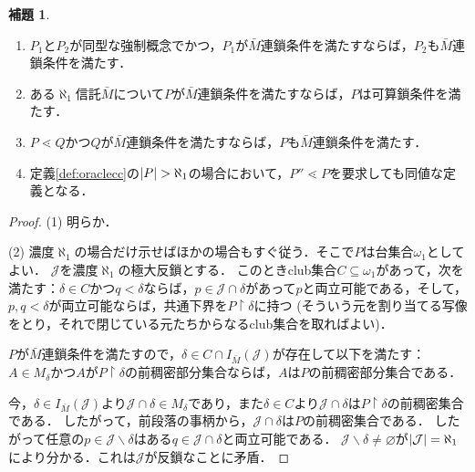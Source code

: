 \documentclass[uplatex]{jsarticle}
\newcommand{\restrict}{\upharpoonright}
\DeclarePairedDelimiter\abs{\lvert}{\rvert}
\renewcommand\emptyset{\varnothing}
\renewcommand\subset{\subseteq}
\renewcommand{\setminus}{\smallsetminus}
\theoremstyle{definition}
\newtheorem{lem}[thm]{補題}
\begin{document}
	\begin{lem}
		\begin{enumerate}
			\item $P_1$と$P_2$が同型な強制概念でかつ，$P_1$が$\bar{M}$連鎖条件を満たすならば，$P_2$も$\bar{M}$連鎖条件を満たす．
			\item ある$\aleph_1$信託$\bar{M}$について$P$が$\bar{M}$連鎖条件を満たすならば，$P$は可算鎖条件を満たす．
			\item $P \lessdot Q$かつ$Q$が$\bar{M}$連鎖条件を満たすならば，$P$も$\bar{M}$連鎖条件を満たす．
			\item 定義\ref{def:oraclecc}の$\abs{P} > \aleph_1$の場合において，$P'' \lessdot P$を要求しても同値な定義となる．
		\end{enumerate}
	\end{lem}
	\begin{proof}
		(1) 明らか．
		
		(2) 濃度$\aleph_1$の場合だけ示せばほかの場合もすぐ従う．そこで$P$は台集合$\omega_1$としてよい．
		$\mathcal{J}$を濃度$\aleph_1$の極大反鎖とする．
		このときclub集合$C \subset \omega_1$があって，次を満たす：$\delta \in C$かつ$q < \delta$ならば，$p \in \mathcal{J} \cap \delta$があって$p$と両立可能である，そして，$p, q < \delta$が両立可能ならば，共通下界を$P \restrict \delta$に持つ (そういう元を割り当てる写像をとり，それで閉じている元たちからなるclub集合を取ればよい)．
		
		$P$が$\bar{M}$連鎖条件を満たすので，$\delta \in C \cap I_{\bar{M}}(\mathcal{J})$が存在して以下を満たす：
		$A \in M_\delta$かつ$A$が$P \restrict \delta$の前稠密部分集合ならば，$A$は$P$の前稠密部分集合である．
		
		今，$\delta \in I_{\bar{M}}(\mathcal{J})$より$\mathcal{J} \cap \delta \in M_\delta$であり，また$\delta \in C$より$\mathcal{J} \cap \delta$は$P \restrict \delta$の前稠密集合である．
		したがって，前段落の事柄から，$\mathcal{J} \cap \delta$は$P$の前稠密集合である．
		したがって任意の$p \in \mathcal{J} \setminus \delta$はある$q \in \mathcal{J} \cap \delta$と両立可能である．
		$\mathcal{J} \setminus \delta \ne \emptyset$が$\abs{\mathcal{J}} = \aleph_1$により分かる．これは$\mathcal{J}$が反鎖なことに矛盾．
\end{proof}
	
	
	\nocite{*}
	\printbibliography[title={参考文献}]
	
\end{document}
